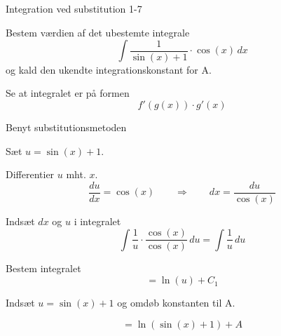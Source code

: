 \documentclass{article}
\begin{document}
\begin{exercise}{Integration ved substitution 1-7}
	
	
	Bestem værdien af det ubestemte integrale
	\[
	\int \frac{1}{\sin(x)+1} \cdot \cos(x) \, dx
	\]
	og kald den ukendte integrationskonstant for A.
	
	
	
	
	\hint
	
	Se at integralet er på formen
	\[
	f'(g(x)) \cdot g'(x)
	\]
	
	\hint
	
	Benyt substitutionsmetoden
	
	\hint
	
	Sæt $u=\sin(x)+1$.
	
	
	\hint
	
	Differentier $u$ mht. $x$.
	\[
	\frac{du}{dx} = \cos(x) \qquad	\Rightarrow \qquad dx = \frac{du}{\cos(x)}
	\]
	
	\hint
	
	Indsæt $dx$ og $u$ i integralet
	\[
	\int \frac{1}{u} \cdot \frac{\cos(x)}{\cos(x)} \, du =  \int \frac{1}{u} \, du
	\]
	
	\hint
	
	Bestem integralet
	\[
	=  \ln(u) + C_1 
	\]
	
	
	\hint
	
	Indsæt $u = \sin(x)+1$ og omdøb konstanten  til A.
	
	\hint
	
	\[
	= \ln(\sin(x)+1) + A
	\]
	
	
\end{exercise}

\newpage
\end{document}
